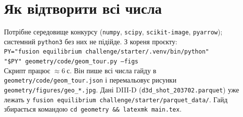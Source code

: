 \section{Як відтворити всі числа}\label{sec:geo1-run}

\begin{practicum}
Потрібне середовище конкурсу (\texttt{numpy}, \texttt{scipy}, \texttt{scikit-image}, \texttt{pyarrow}); системний \texttt{python3} без них не підійде. З кореня проєкту:\\
\texttt{PY="fusion equilibrium challenge/starter/.venv/bin/python"}\\
\texttt{"\$PY" geometry/code/geom\_tour.py --figs}\\
Скрипт працює $\approx\SI{6}{с}$. Він пише всі числа гайду в \texttt{geometry/code/geom\_tour.json} і перемальовує рисунки \texttt{geometry/figures/geo\_*.jpg}. Дані DIII-D (\texttt{d3d\_shot\_203702.parquet}) уже лежать у \texttt{fusion equilibrium challenge/starter/parquet\_data/}. Гайд збирається командою \texttt{cd geometry \&\& latexmk main.tex}.
\end{practicum}
